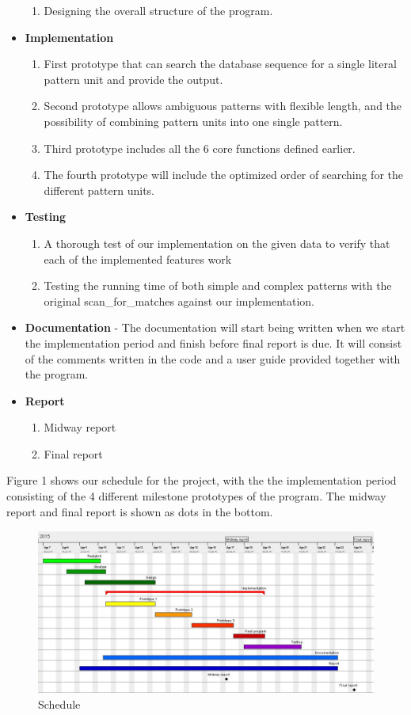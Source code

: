 \documentclass[12pt]{article}
\begin{document}
\begin{itemize}
\begin{enumerate}
\item Designing the overall structure of the program.
\end{enumerate}
\item \textbf{Implementation}
\begin{enumerate}
\item First prototype that can search the database sequence for a single literal pattern unit and provide the output.
\item Second prototype allows ambiguous patterns with flexible length, and the possibility of combining pattern units
into one single pattern.
\item Third prototype includes all the 6 core functions defined earlier.
\item The fourth prototype will include the optimized order of searching for the different pattern units.
\end{enumerate}
\item \textbf{Testing}
\begin{enumerate}
\item A thorough test of our implementation on the given data to verify that each of the implemented features work
\item Testing the running time of both simple and complex patterns with the original scan\_for\_matches against our
implementation.
\end{enumerate}
\item \textbf{Documentation} - The documentation will start being written when we start the implementation period
and finish before final report is due. It will consist of the comments written in the code and a user guide provided 
together with the program.
\item \textbf{Report}
\begin{enumerate}
\item Midway report
\item Final report
\end{enumerate}
\end{itemize}
Figure 1 shows our schedule for the project, with the the implementation period consisting of the 4 different milestone
prototypes of the program. The midway report and final report is shown as dots in the bottom.
\begin{figure}[h!]
\includegraphics[scale=0.7]{gantt.png}
\caption{Schedule}
\end{figure}
\end{document}
